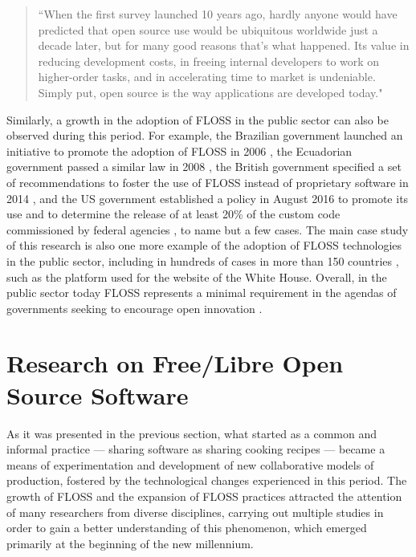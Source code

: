 \begin{quotation}
``When the first survey launched 10 years ago, hardly anyone would have predicted that open source use would be ubiquitous worldwide just a decade later, but for many good reasons that's what happened. Its value in reducing development costs, in freeing internal developers to work on higher-order tasks, and in accelerating time to market is undeniable. Simply put, open source is the way applications are developed today."
\end{quotation}

Similarly, a growth in the adoption of FLOSS in the public sector can also be observed during this period. For example, the Brazilian government launched an initiative to promote the adoption of FLOSS in 2006 \parencite{schoonmaker2007globalization},  the Ecuadorian government passed a similar law in 2008 \parencite{decreto-1014:Online}, the British government specified a set of recommendations to foster the use of FLOSS instead of proprietary software in 2014 \parencite{uk-government-manual:2014:Online}, and the US government established a policy in August 2016 to promote its use and to determine the release of at least 20\% of the custom code commissioned by federal agencies \parencite{m1621-us:Online}, to name but a few cases. The main case study of this research is also one more example of the adoption of FLOSS technologies in the public sector, including in hundreds of cases in more than 150 countries \parencite{drupal-government:2014:Online}, such as the platform used for the website of the White House. Overall, in the public sector today FLOSS represents a minimal requirement in the agendas of governments seeking to encourage open innovation \parencite{lee2012open}.

\section{Research on Free\slash Libre Open Source Software}
\label{subsubsec:state-art:floss:academic-research}

As it was presented in the previous section, what started as a common and informal practice --- sharing software as sharing cooking recipes --- became a means of experimentation and development of new collaborative models of production, fostered by the technological changes experienced in this period. The growth of FLOSS and the expansion of FLOSS practices attracted the attention of many researchers from diverse disciplines, carrying out multiple studies in order to gain a better understanding of this phenomenon, which emerged primarily at the beginning of the new millennium. 


